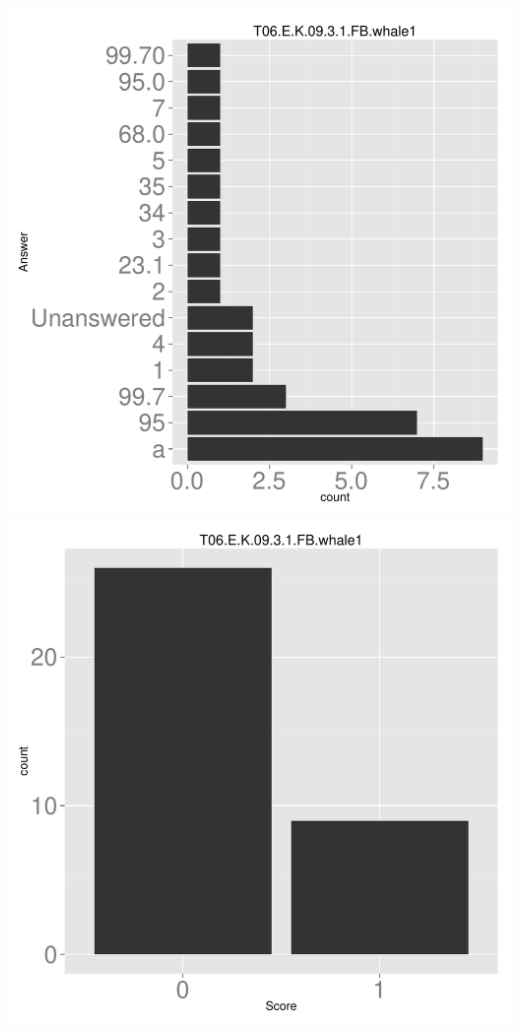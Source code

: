 \documentclass[12pt,nohyper]{tufte-handout}\usepackage[]{graphicx}\usepackage[]{color}
\begin{document}
\begin{center} \includegraphics[width=.45\linewidth]{Topic06_27_answer} \includegraphics[width=.45\linewidth]{Topic06_27_score} \end{center} 
\end{document}
